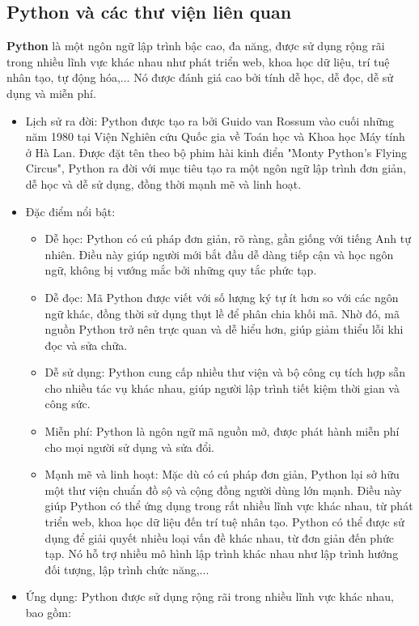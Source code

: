 \subsection{Python và các thư viện liên quan}
\textbf{Python} là một ngôn ngữ lập trình bậc cao, đa năng, được sử dụng rộng rãi trong nhiều lĩnh vực khác nhau như phát triển web, khoa học dữ liệu, trí tuệ nhân tạo, tự động hóa,... Nó được đánh giá cao bởi tính dễ học, dễ đọc, dễ sử dụng và miễn phí.
\begin{itemize}
    \item Lịch sử ra đời:
    Python được tạo ra bởi Guido van Rossum vào cuối những năm 1980 tại Viện Nghiên cứu Quốc gia về Toán học và Khoa học Máy tính ở Hà Lan. Được đặt tên theo bộ phim hài kinh điển "Monty Python's Flying Circus", Python ra đời với mục tiêu tạo ra một ngôn ngữ lập trình đơn giản, dễ học và dễ sử dụng, đồng thời mạnh mẽ và linh hoạt.
    \item Đặc điểm nổi bật:
        \begin{itemize}
            \item Dễ học: Python có cú pháp đơn giản, rõ ràng, gần giống với tiếng Anh tự nhiên. Điều này giúp người mới bắt đầu dễ dàng tiếp cận và học ngôn ngữ, không bị vướng mắc bởi những quy tắc phức tạp.
            \item Dễ đọc: Mã Python được viết với số lượng ký tự ít hơn so với các ngôn ngữ khác, đồng thời sử dụng thụt lề để phân chia khối mã. Nhờ đó, mã nguồn Python trở nên trực quan và dễ hiểu hơn, giúp giảm thiểu lỗi khi đọc và sửa chữa.
            \item Dễ sử dụng: Python cung cấp nhiều thư viện và bộ công cụ tích hợp sẵn cho nhiều tác vụ khác nhau, giúp người lập trình tiết kiệm thời gian và công sức.
            \item Miễn phí: Python là ngôn ngữ mã nguồn mở, được phát hành miễn phí cho mọi người sử dụng và sửa đổi.
            \item Mạnh mẽ và linh hoạt: Mặc dù có cú pháp đơn giản, Python lại sở hữu một thư viện chuẩn đồ sộ và cộng đồng người dùng lớn mạnh. Điều này giúp Python có thể ứng dụng trong rất nhiều lĩnh vực khác nhau, từ phát triển web, khoa học dữ liệu đến trí tuệ nhân tạo. Python có thể được sử dụng để giải quyết nhiều loại vấn đề khác nhau, từ đơn giản đến phức tạp. Nó hỗ trợ nhiều mô hình lập trình khác nhau như lập trình hướng đối tượng, lập trình chức năng,...
        \end{itemize}
    \item Ứng dụng: 
    Python được sử dụng rộng rãi trong nhiều lĩnh vực khác nhau, bao gồm:

\end{itemize}
